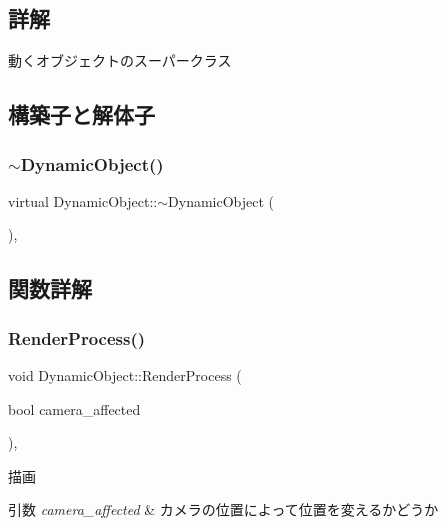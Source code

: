 \subsection{詳解}
動くオブジェクトのスーパークラス 

\subsection{構築子と解体子}
\mbox{\label{class_dynamic_object_af9141dddf35d338d5bae491cb0455583}} 
\subsubsection{\texorpdfstring{$\sim$\+Dynamic\+Object()}{~DynamicObject()}}
{\footnotesize\ttfamily virtual Dynamic\+Object\+::$\sim$\+Dynamic\+Object (\begin{DoxyParamCaption}{ }\end{DoxyParamCaption})\hspace{0.3cm}{\ttfamily [inline]}, {\ttfamily [virtual]}}



\subsection{関数詳解}
\mbox{\label{class_dynamic_object_aa7488e1b4dfd7049447535d93d9d6783}} 
\subsubsection{\texorpdfstring{Render\+Process()}{RenderProcess()}}
{\footnotesize\ttfamily void Dynamic\+Object\+::\+Render\+Process (\begin{DoxyParamCaption}\item[{bool}]{camera\+\_\+affected }\end{DoxyParamCaption})\hspace{0.3cm}{\ttfamily [protected]}, {\ttfamily [virtual]}}



描画 


\begin{DoxyParams}{引数}
{\em camera\+\_\+affected} & カメラの位置によって位置を変えるかどうか \\
\hline
\end{DoxyParams}


